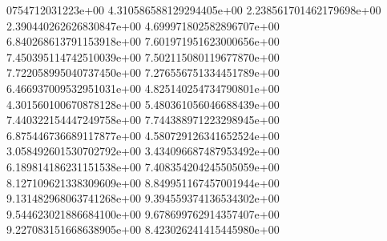 0754712031223e+00	4.310586588129294405e+00	2.238561701462179698e+00	2.390440262626830847e+00	4.699971802582896707e+00	6.840268613791153918e+00	7.601971951623000656e+00	7.450395114742510039e+00	7.502115080119677870e+00	7.722058995040737450e+00	7.276556751334451789e+00	6.466937009532951031e+00	4.825140254734790801e+00	4.301560100670878128e+00	5.480361056046688439e+00	7.440322154447249758e+00	7.744388971223298945e+00	6.875446736689117877e+00	4.580729126341652524e+00	3.058492601530702792e+00	3.434096687487953492e+00	6.189814186231151538e+00	7.408354204245505059e+00	8.127109621338309609e+00	8.849951167457001944e+00	9.131482968063741268e+00	9.394559374136534302e+00	9.544623021886684100e+00	9.678699762914357407e+00	9.227083151668638905e+00	8.423026241415445980e+00
